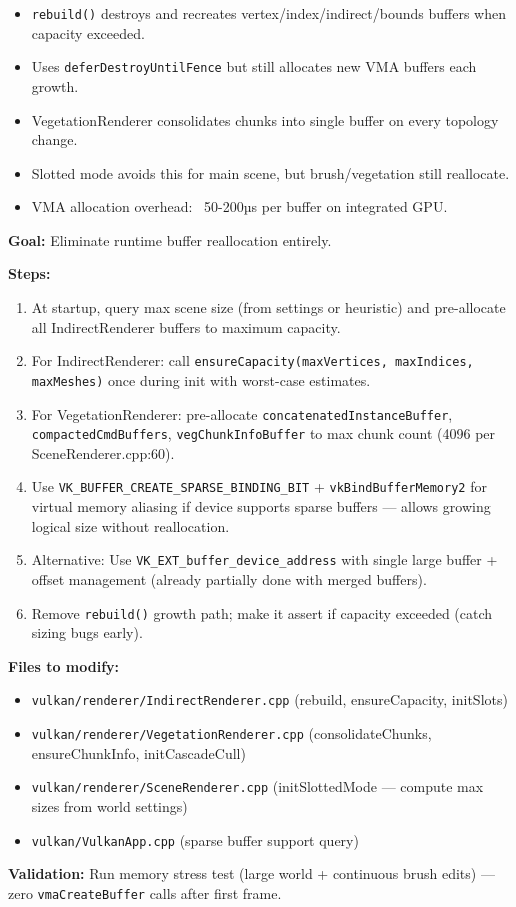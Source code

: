 \documentclass[11pt,a4paper]{article}
\begin{document}
\begin{itemize}
    \item \texttt{rebuild()} destroys and recreates vertex/index/indirect/bounds buffers when capacity exceeded.
    \item Uses \texttt{deferDestroyUntilFence} but still allocates new VMA buffers each growth.
    \item VegetationRenderer consolidates chunks into single buffer on every topology change.
    \item Slotted mode avoids this for main scene, but brush/vegetation still reallocate.
    \item VMA allocation overhead: ~50-200µs per buffer on integrated GPU.
\end{itemize}

\begin{tcolorbox}[promptbox={Prompt: Pre-allocate Maximum Buffers / Use Virtual Aliasing}]
\textbf{Goal:} Eliminate runtime buffer reallocation entirely.

\textbf{Steps:}
\begin{enumerate}
    \item At startup, query max scene size (from settings or heuristic) and pre-allocate all IndirectRenderer buffers to maximum capacity.
    \item For IndirectRenderer: call \texttt{ensureCapacity(maxVertices, maxIndices, maxMeshes)} once during init with worst-case estimates.
    \item For VegetationRenderer: pre-allocate \texttt{concatenatedInstanceBuffer}, \texttt{compactedCmdBuffers}, \texttt{vegChunkInfoBuffer} to max chunk count (4096 per SceneRenderer.cpp:60).
    \item Use \texttt{VK\_BUFFER\_CREATE\_SPARSE\_BINDING\_BIT} + \texttt{vkBindBufferMemory2} for virtual memory aliasing if device supports sparse buffers — allows growing logical size without reallocation.
    \item Alternative: Use \texttt{VK\_EXT\_buffer\_device\_address} with single large buffer + offset management (already partially done with merged buffers).
    \item Remove \texttt{rebuild()} growth path; make it assert if capacity exceeded (catch sizing bugs early).
\end{enumerate}

\textbf{Files to modify:}
\begin{itemize}
    \item \texttt{vulkan/renderer/IndirectRenderer.cpp} (rebuild, ensureCapacity, initSlots)
    \item \texttt{vulkan/renderer/VegetationRenderer.cpp} (consolidateChunks, ensureChunkInfo, initCascadeCull)
    \item \texttt{vulkan/renderer/SceneRenderer.cpp} (initSlottedMode — compute max sizes from world settings)
    \item \texttt{vulkan/VulkanApp.cpp} (sparse buffer support query)
\end{itemize}

\textbf{Validation:} Run memory stress test (large world + continuous brush edits) — zero \texttt{vmaCreateBuffer} calls after first frame.
\end{tcolorbox}
\end{document}
